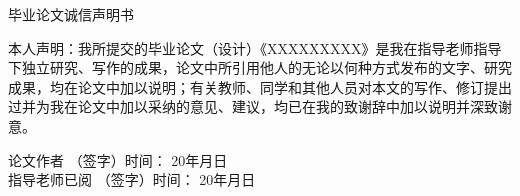 %
%

\clearpage
{%

\thispagestyle{empty}
\pagestyle{empty}

\begin{center}
    \vspace{1cm}
    \hei\xiaoer %
    {毕业论文诚信声明书}
\end{center}
\vspace{1cm} %

{%
\song\xiaosi
本人声明：我所提交的毕业论文（设计）《XXXXXXXXX》是我在指导老师指导下独立研究、写作的成果，论文中所引用他人的无论以何种方式发布的文字、研究成果，均在论文中加以说明；有关教师、同学和其他人员对本文的写作、修订提出过并为我在论文中加以采纳的意见、建议，均已在我的致谢辞中加以说明并深致谢意。
\vspace{1.5cm} %

\noindent
论文作者\hspace{1.5cm} （签字）\hfill 时间：\hspace{0.5cm} 20\underline{\hspace{1.5cm}}年\underline{\hspace{1cm}}月\underline{\hspace{1cm}}日\\

\noindent
指导老师已阅\hspace{1.2cm} （签字）\hfill 时间：\hspace{0.5cm} 20\underline{\hspace{1.5cm}}年\underline{\hspace{1cm}}月\underline{\hspace{1cm}}日
} %
} %

\vspace{3cm}

